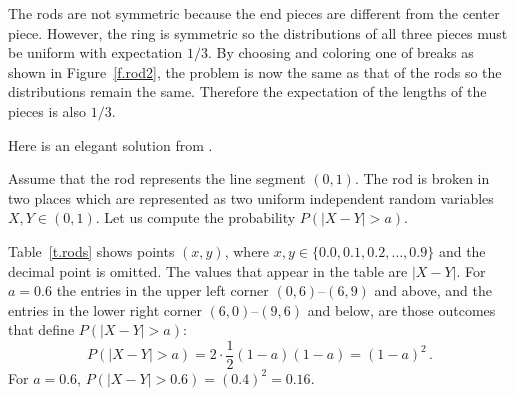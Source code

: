 
The rods are not symmetric because the end pieces are different from the center piece. However, the ring is symmetric so the distributions of all three pieces must be uniform with expectation $1/3$. By choosing and coloring one of breaks as shown in Figure~\ref{f.rod2}, the problem is now the same as that of the rods so the distributions remain the same. Therefore the expectation of the lengths of the pieces is also $1/3$.


Here is an elegant solution from \cite{stack-rods}.

Assume that the rod represents the line segment $(0,1)$. The rod is broken in two places which are represented as two uniform independent random variables $X,Y\in (0,1)$. Let us compute the probability $P(|X-Y|>a)$.

Table~\ref{t.rods} shows points $(x,y)$, where $x,y \in \{0.0, 0.1, 0.2, \ldots, 0.9\}$ and the decimal point is omitted. The values that appear in the table are $|X-Y|$. For $a=0.6$ the entries in the upper left corner $(0,6)$--$(6,9)$ and above, and the entries in the lower right corner $(6,0)$--$(9,6)$ and below, are those outcomes that define $P(|X-Y|>a)$:
\[
P(|X-Y|>a)=2\cdot \frac{1}{2}(1-a)(1-a)=(1-a)^2\,.
\]
For $a=0.6$, $P(|X-Y|>0.6)=(0.4)^2=0.16$.

